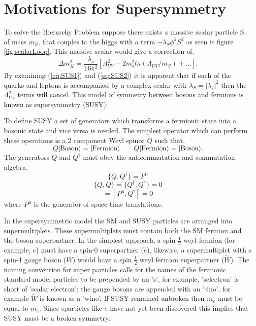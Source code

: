 \section{Motivations for Supersymmetry}
To solve the Hierarchy Problem suppose there exists a massive scalar particle S, 
of mass $m_{S}$, that couples
to the higgs with a term $-\lambda_{S}\phi^{2} S^{2}$ as seen is 
figure \ref{fig:scalarLoop}. This massive scalar would give a correction of,
\begin{equation}
\Delta m_{H}^{2}=\frac{\lambda_{s}}{16\pi^{2}}\left[\Lambda_{UV}^{2}-2m_{s}^{2}ln(\Lambda_{UV}/m_{S})+... \right].
\label{eq:SUS2}
\end{equation}
By examining (\ref{eq:SUS1}) and (\ref{eq:SUS2}) it is apparent that if each of the quarks
and leptons is accompanied by a complex scalar with $\lambda_{S}=|\lambda_{f}|^{2}$  %
then the $\Lambda_{UV}^{2}$ terms will cancel. This model of symmetry between bosons
and fermions is known as supersymmetry (SUSY).


To define SUSY a set of generators which 
transforms a fermionic state into a bosonic state and vice versa is needed. The simplest 
operator which can perform these operations is a 2 component Weyl spinor $Q$
such that,
\begin{equation}
Q|\mathrm{Boson}\rangle=|\mathrm{Fermion}\rangle \qquad Q|\mathrm{Fermion}\rangle=|\mathrm{Boson}\rangle.
\end{equation}
The generators $Q$ and $Q^{\dagger}$ must obey the anticommutation
and commutation algebra,
\begin{equation}
\{Q,Q^{\dagger}\}=P^{\mu}
\end{equation}
\begin{equation}
\{Q,Q\}=\{Q^{\dagger},Q^{\dagger}\}=0
\end{equation}
\begin{equation}
[P^{\mu},Q ]=[P^{\mu},Q^{\dagger}]=0
\end{equation}
where $P^{\mu}$ is the generator of space-time translations.

In the supersymmetric model the SM and SUSY particles are arranged
into supermultiplets. These supermultiplets must contain both the SM fermion
and the boson superpartner. In the simplest approach, a  spin $\frac{1}{2}$
weyl fermion (for example, $e$) must have %
a spin-0 superpartner ($\tilde{e}$), likewise, a supermultiplet 
with a spin-1 gauge boson ($W$) would have
 a spin $\frac{1}{2}$ weyl fermion superpartner ($\tilde{W}$).
The naming convention for super particles calls for the names of
the fermionic standard model particles to be prepended by an 's', for example, 
'selectron' is short of 'scalar electron'; the gauge bosons are appended
with an '-ino', for example $\tilde{W}$ is known as a 'wino'. If SUSY remained unbroken
then $m_{e}$ must be equal to $m_{\tilde{e}}$. Since sparticles like $\tilde{e}$ have not 
yet been discovered this implies that SUSY must be a broken
symmetry.
